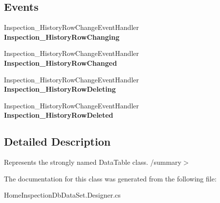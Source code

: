 \subsection*{Events}
\begin{DoxyCompactItemize}
\item 
\mbox{\label{class_a_f_h___scheduler_1_1_home_inspection_db_data_set_1_1_inspection___history_data_table_af3162291e2b8003bdddda39007c8c74a}} 
Inspection\+\_\+\+History\+Row\+Change\+Event\+Handler {\bfseries Inspection\+\_\+\+History\+Row\+Changing}
\item 
\mbox{\label{class_a_f_h___scheduler_1_1_home_inspection_db_data_set_1_1_inspection___history_data_table_aa588222c58dd32a6efdbe0988ad14272}} 
Inspection\+\_\+\+History\+Row\+Change\+Event\+Handler {\bfseries Inspection\+\_\+\+History\+Row\+Changed}
\item 
\mbox{\label{class_a_f_h___scheduler_1_1_home_inspection_db_data_set_1_1_inspection___history_data_table_a5305bef7c4c42977428d69804dc47441}} 
Inspection\+\_\+\+History\+Row\+Change\+Event\+Handler {\bfseries Inspection\+\_\+\+History\+Row\+Deleting}
\item 
\mbox{\label{class_a_f_h___scheduler_1_1_home_inspection_db_data_set_1_1_inspection___history_data_table_a89fdf12328fae995c00328db176b1996}} 
Inspection\+\_\+\+History\+Row\+Change\+Event\+Handler {\bfseries Inspection\+\_\+\+History\+Row\+Deleted}
\end{DoxyCompactItemize}


\subsection{Detailed Description}
Represents the strongly named Data\+Table class. /summary$>$ 

The documentation for this class was generated from the following file\+:\begin{DoxyCompactItemize}
\item 
Home\+Inspection\+Db\+Data\+Set.\+Designer.\+cs\end{DoxyCompactItemize}
